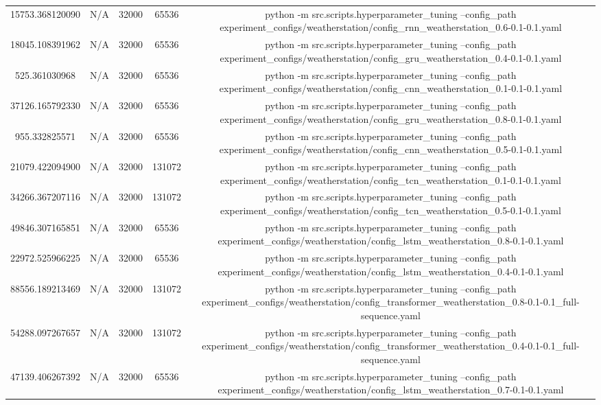 \begin{table}[h]
\begin{tabular}{c | c | c | c | c}
15753.368120090 & N/A & 32000 & 65536 & python -m src.scripts.hyperparameter_tuning --config_path experiment_configs/weatherstation/config_rnn_weatherstation_0.6-0.1-0.1.yaml \\
18045.108391962 & N/A & 32000 & 65536 & python -m src.scripts.hyperparameter_tuning --config_path experiment_configs/weatherstation/config_gru_weatherstation_0.4-0.1-0.1.yaml \\
525.361030968 & N/A & 32000 & 65536 & python -m src.scripts.hyperparameter_tuning --config_path experiment_configs/weatherstation/config_cnn_weatherstation_0.1-0.1-0.1.yaml \\
37126.165792330 & N/A & 32000 & 65536 & python -m src.scripts.hyperparameter_tuning --config_path experiment_configs/weatherstation/config_gru_weatherstation_0.8-0.1-0.1.yaml \\
955.332825571 & N/A & 32000 & 65536 & python -m src.scripts.hyperparameter_tuning --config_path experiment_configs/weatherstation/config_cnn_weatherstation_0.5-0.1-0.1.yaml \\
21079.422094900 & N/A & 32000 & 131072 & python -m src.scripts.hyperparameter_tuning --config_path experiment_configs/weatherstation/config_tcn_weatherstation_0.1-0.1-0.1.yaml \\
34266.367207116 & N/A & 32000 & 131072 & python -m src.scripts.hyperparameter_tuning --config_path experiment_configs/weatherstation/config_tcn_weatherstation_0.5-0.1-0.1.yaml \\
49846.307165851 & N/A & 32000 & 65536 & python -m src.scripts.hyperparameter_tuning --config_path experiment_configs/weatherstation/config_lstm_weatherstation_0.8-0.1-0.1.yaml \\
22972.525966225 & N/A & 32000 & 65536 & python -m src.scripts.hyperparameter_tuning --config_path experiment_configs/weatherstation/config_lstm_weatherstation_0.4-0.1-0.1.yaml \\
88556.189213469 & N/A & 32000 & 131072 & python -m src.scripts.hyperparameter_tuning --config_path experiment_configs/weatherstation/config_transformer_weatherstation_0.8-0.1-0.1_full-sequence.yaml \\
54288.097267657 & N/A & 32000 & 131072 & python -m src.scripts.hyperparameter_tuning --config_path experiment_configs/weatherstation/config_transformer_weatherstation_0.4-0.1-0.1_full-sequence.yaml \\
47139.406267392 & N/A & 32000 & 65536 & python -m src.scripts.hyperparameter_tuning --config_path experiment_configs/weatherstation/config_lstm_weatherstation_0.7-0.1-0.1.yaml \\

\end{tabular}
\end{table}
